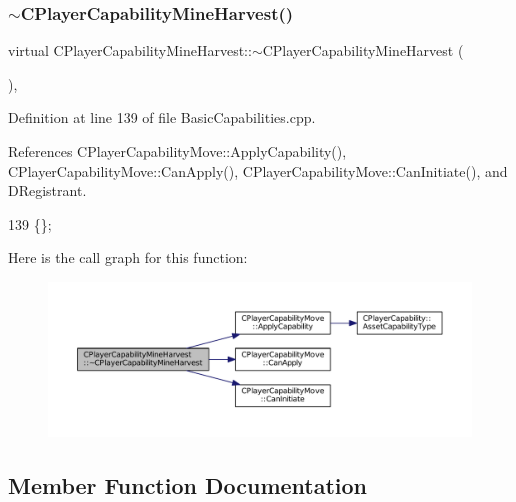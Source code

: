 \subsubsection{\texorpdfstring{$\sim$\+C\+Player\+Capability\+Mine\+Harvest()}{~CPlayerCapabilityMineHarvest()}}
{\footnotesize\ttfamily virtual C\+Player\+Capability\+Mine\+Harvest\+::$\sim$\+C\+Player\+Capability\+Mine\+Harvest (\begin{DoxyParamCaption}{ }\end{DoxyParamCaption})\hspace{0.3cm}{\ttfamily [inline]}, {\ttfamily [virtual]}}



Definition at line 139 of file Basic\+Capabilities.\+cpp.



References C\+Player\+Capability\+Move\+::\+Apply\+Capability(), C\+Player\+Capability\+Move\+::\+Can\+Apply(), C\+Player\+Capability\+Move\+::\+Can\+Initiate(), and D\+Registrant.


\begin{DoxyCode}
139 \{\};
\end{DoxyCode}
Here is the call graph for this function\+:\nopagebreak
\begin{figure}[H]
\begin{center}
\leavevmode
\includegraphics[width=350pt]{classCPlayerCapabilityMineHarvest_aae786f3ba01e3f26359a38166af77ce5_cgraph}
\end{center}
\end{figure}


\subsection{Member Function Documentation}
\hypertarget{classCPlayerCapabilityMineHarvest_a76a72fe97148f5026e67aab24ab21b21}{}\label{classCPlayerCapabilityMineHarvest_a76a72fe97148f5026e67aab24ab21b21} 
